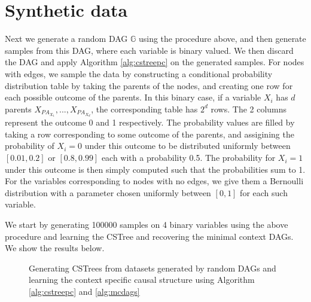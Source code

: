 \documentclass{tufte-book}
\begin{document}
\section{Synthetic data}
\label{sec:org249dfe8}
Next we generate a random DAG \(\mathbb{G}\) using the procedure above, and then generate samples from this DAG, where each variable is binary valued. We then discard the DAG and apply Algorithm \ref{alg:cstreepc} on the generated samples. For nodes with edges, we sample the data by constructing a conditional probability distribution table by taking the parents of the nodes, and creating one row for each possible outcome of the parents. In this binary case, if a variable \(X_i\) has \(d\) parents \(X_{PA_{X_1}},...,X_{PA_{X_d}}\), the corresponding table has \(2^d\) rows. The 2 columns represent the outcome 0 and 1 respectively. The probability values are filled by taking a row corresponding to some outcome of the parents, and assigining the probability of \(X_i=0\) under this outcome to be distributed uniformly between \([0.01,0.2]\) or \([0.8,0.99]\) each with a probability 0.5. The probability for \(X_i=1\) under this outcome is then simply computed such that the probabilities sum to 1. For the variables corresponding to nodes with no edges, we give them a Bernoulli distribution with a parameter chosen uniformly between \([0,1]\) for each such variable.



We start by generating 100000 samples on 4 binary variables using the above procedure and learning the CSTree and recovering the minimal context DAGs. We show the results below.
\begin{figure}[!h]\label{fig:synthetic_exp1}
   \begin{floatrow}
%
\caption{Generating CSTrees from datasets generated by random DAGs and learning the context specific causal structure using Algorithm \ref{alg:cstreepc} and \ref{alg:mcdags}}
        
   \end{floatrow}
\end{figure}
\end{document}
